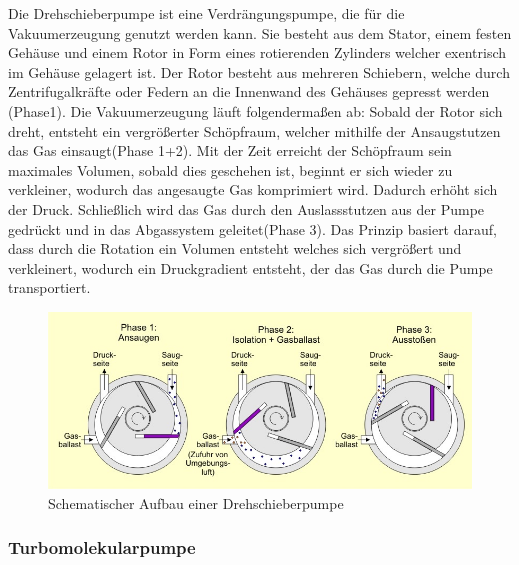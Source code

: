 Die Drehschieberpumpe ist eine Verdrängungspumpe, die für die Vakuumerzeugung genutzt werden kann.
Sie besteht aus dem Stator, einem festen Gehäuse und einem Rotor in Form eines rotierenden
Zylinders welcher exentrisch im Gehäuse gelagert ist. Der Rotor besteht aus mehreren Schiebern, welche durch Zentrifugalkräfte 
oder Federn an die Innenwand des Gehäuses gepresst werden (Phase1). Die Vakuumerzeugung läuft folgendermaßen ab:
Sobald der Rotor sich dreht, entsteht ein vergrößerter Schöpfraum, welcher mithilfe der Ansaugstutzen das Gas
einsaugt(Phase 1+2). Mit der Zeit erreicht der Schöpfraum sein maximales Volumen, sobald dies geschehen ist, beginnt er sich wieder zu 
verkleiner, wodurch das angesaugte Gas komprimiert wird. Dadurch erhöht sich der Druck. Schließlich wird das Gas durch den Auslassstutzen 
aus der Pumpe gedrückt und in das Abgassystem geleitet(Phase 3). Das Prinzip basiert darauf, dass durch die Rotation ein Volumen entsteht welches sich vergrößert 
und verkleinert, wodurch ein Druckgradient entsteht, der das Gas durch die Pumpe transportiert.
\cite{Drehschieberpumpe}

\begin{figure}
    \includegraphics[width=\textwidth]{bilder/pumpe.jpeg}
    \caption{Schematischer Aufbau einer Drehschieberpumpe}
\end{figure}


\subsubsection{Turbomolekularpumpe}

